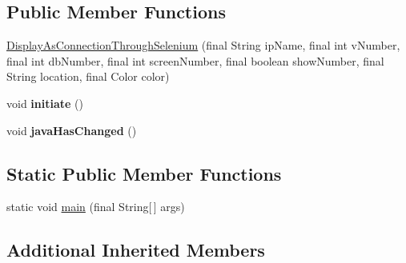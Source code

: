 \subsection*{Public Member Functions}
\begin{DoxyCompactItemize}
\item 
\hyperlink{classgov_1_1fnal_1_1ppd_1_1dd_1_1display_1_1client_1_1selenium_1_1DisplayAsConnectionThroughSelenium_abb5c9f83153fe7d81a5dcf2c8dd88e67}{Display\-As\-Connection\-Through\-Selenium} (final String ip\-Name, final int v\-Number, final int db\-Number, final int screen\-Number, final boolean show\-Number, final String location, final Color color)
\item 
\hypertarget{classgov_1_1fnal_1_1ppd_1_1dd_1_1display_1_1client_1_1selenium_1_1DisplayAsConnectionThroughSelenium_ab305c221b590a686a18f4bd7072cf730}{void {\bfseries initiate} ()}\label{classgov_1_1fnal_1_1ppd_1_1dd_1_1display_1_1client_1_1selenium_1_1DisplayAsConnectionThroughSelenium_ab305c221b590a686a18f4bd7072cf730}

\item 
\hypertarget{classgov_1_1fnal_1_1ppd_1_1dd_1_1display_1_1client_1_1selenium_1_1DisplayAsConnectionThroughSelenium_a17d23c1c5e1a8ded785bcea9c5c1e5dd}{void {\bfseries java\-Has\-Changed} ()}\label{classgov_1_1fnal_1_1ppd_1_1dd_1_1display_1_1client_1_1selenium_1_1DisplayAsConnectionThroughSelenium_a17d23c1c5e1a8ded785bcea9c5c1e5dd}

\end{DoxyCompactItemize}
\subsection*{Static Public Member Functions}
\begin{DoxyCompactItemize}
\item 
static void \hyperlink{classgov_1_1fnal_1_1ppd_1_1dd_1_1display_1_1client_1_1selenium_1_1DisplayAsConnectionThroughSelenium_a4521e424f08cb1e37b0f80fa23d75e54}{main} (final String\mbox{[}$\,$\mbox{]} args)
\end{DoxyCompactItemize}
\subsection*{Additional Inherited Members}


